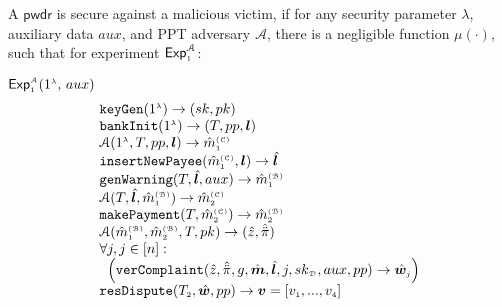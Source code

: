\begin{definition}\label{def-a::Security-against-malicious-victim} A $\mathsf{pwdr}$  is secure against a malicious victim, if for any security parameter $\lambda$,  auxiliary data $aux$, and   PPT adversary $\mathcal{A}$, there is a negligible function $\mu(\cdot)$, such that for  experiment $\mathsf{Exp}_{\scriptscriptstyle 1}^{\mathcal{A}}$:
%


\vspace{-2mm}

{\small{
\begin{center}
\begin{mybox}[colback=white,  width=81mm, height=47mm, left=.3mm, drop fuzzy shadow southwest]{{{$\mathsf{Exp}_{\scriptscriptstyle 1}^{\scriptscriptstyle\mathcal{A}}(1^{\scriptscriptstyle\lambda}\text{, }  
{aux})$}}}
%
\vspace{-.8mm}
$$
  \begin{array}{l}
    \mathtt{keyGen}(1^{\st\lambda})\rightarrow (sk,pk)\\
  \mathtt{bankInit}(1^{\st \lambda})\rightarrow (T, pp, \bm{l}) \\
      \mathcal{A}( 1^{\st \lambda}, T, pp, \bm{l} )\rightarrow \hat m^{\st\mathcal{(C)}}_{\st 1} \\
%   
\mathtt{insertNewPayee}(\hat{m}^{\st\mathcal{(C)}}_{\st 1}, {\bm l})\rightarrow \hat{\bm l} \\
%
\mathtt{genWarning}(T, \hat{\bm l}, {aux})\rightarrow \hat m^{\st\mathcal{(B)}}_{\st1} \\
%
   \mathcal{A}(T,  \hat{\bm{l}}, \hat m^{\st\mathcal{(B)}}_{\st1})\rightarrow \hat m^{\st\mathcal{(C)}}_{\st2} \\
%
   \mathtt{makePayment}(T, \hat m^{\st\mathcal{(C)}}_{\st2})\rightarrow \hat m^{\st\mathcal{(B)}}_{\st2} \\
\mathcal{A}(\hat m^{\st\mathcal{(B)}}_{\st 1}, \hat m^{\st\mathcal{(B)}}_{\st2}, T, pk)\rightarrow (\hat z, \hat{\ddot \pi})\\
%
 \forall j, j\in [n]:\\
\hspace{2mm}\Big(\mathtt{verComplaint}( \hat z, \hat{\ddot{\pi}}, g, \hat{\bm{m}}, \hat{\bm{l}}, j, sk_{\st\mathcal D}, aux, pp)\rightarrow \hat{\bm{w}}_{\st j}%
\Big) \\
\mathtt{resDispute}(T_{\st 2}, \hat{\bm w}, pp)\rightarrow \bm v=[v_{\st 1},..., v_{\st 4}]
   \end{array} 
$$
\end{mybox}
%
\end{center}
}}



\end{definition}
